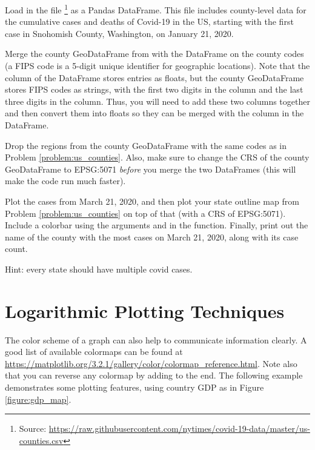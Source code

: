 \begin{problem}
Load in the file \footnote{Source: \url{https://raw.githubusercontent.com/nytimes/covid-19-data/master/us-counties.csv}} as a Pandas DataFrame.
This file includes county-level data for the cumulative cases and deaths of Covid-19 in the US, starting with the first case in Snohomish County, Washington, on January 21, 2020.

Merge the county GeoDataFrame from  with the  DataFrame on the county  codes (a FIPS code is a 5-digit unique identifier for geographic locations).
Note that the  column of the  DataFrame stores entries as floats, but the county GeoDataFrame stores FIPS codes as strings, with the first two digits in the  column and the last three digits in the  column.
Thus, you will need to add these two columns together and then convert them into floats so they can be merged with the  column in the  DataFrame.

Drop the regions from the county GeoDataFrame with the same  codes as in Problem \ref{problem:us_counties}.
Also, make sure to change the CRS of the county GeoDataFrame to EPSG:5071 \emph{before} you merge the two DataFrames (this will make the code run much faster).

Plot the cases from March 21, 2020, and then plot your state outline map from Problem \ref{problem:us_counties} on top of that (with a CRS of EPSG:5071).
Include a colorbar using the arguments  and  in the  function.
Finally, print out the name of the county with the most cases on March 21, 2020, along with its case count.

\noindent Hint: every state should have multiple covid cases.
\label{problem:merge_covid}
\end{problem}

\section*{Logarithmic Plotting Techniques} %

The color scheme of a graph can also help to communicate information clearly.
A good list of available colormaps can be found at \url{https://matplotlib.org/3.2.1/gallery/color/colormap_reference.html}.
Note also that you can reverse any colormap by adding  to the end.
The following example demonstrates some plotting features, using country GDP as in Figure \ref{figure:gdp_map}.

